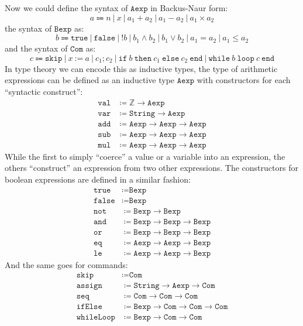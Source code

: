 \documentclass[
  a4paper, 
  10pt, 
  parskip=half, 
  DIV=20,
  toc=bibliography,
  usegeometry,
]{scrartcl}
\begin{document}
Now we could define the syntax of \(\texttt{Aexp}\) in Backus-Naur form:
\[
a \Coloneqq n \ | \ x \ | \ a_1 + a_2 \ | \ a_1 - a_2 \ | \ a_1 \times a_2
\]
the syntax of \(\texttt{Bexp}\) as:
\[
b \Coloneqq \texttt{true} \ | \ \texttt{false} \ | \ 
  !b \ | \ b_1 \land b_2 \ | \ b_1 \lor b_2 \ | \ a_1 = a_2 \ | \ a_1 \leq a_2
\]
and the syntax of \(\texttt{Com}\) as:
\[
c \Coloneqq \texttt{skip} \ | \ x \ \texttt{:=} \ a \ | \ c_1; c_2 \ | \
      \texttt{if} \ b \ \texttt{then} \ c_1 \ \texttt{else} \ c_2 \ \texttt{end} 
      \ | \ \texttt{while} \ b \ \texttt{loop} \ c \ \texttt{end}
\]
In type theory we can encode this as inductive types, the type of arithmetic 
expressions can be defined as an inductive type \(\texttt{Aexp}\) with 
constructors for each \enquote{syntactic construct}:
\begin{align*}
  \texttt{val} &\coloneqq \mathbb{Z} \to \texttt{Aexp} \\
  \texttt{var} &\coloneqq \texttt{String} \to \texttt{Aexp} \\
  \texttt{add} &\coloneqq \texttt{Aexp} \to \texttt{Aexp} \to \texttt{Aexp} \\
  \texttt{sub} &\coloneqq \texttt{Aexp} \to \texttt{Aexp} \to \texttt{Aexp} \\
  \texttt{mul} &\coloneqq \texttt{Aexp} \to \texttt{Aexp} \to \texttt{Aexp}
\end{align*}
While the first to simply \enquote{coerce} a value or a variable into an
expression, the others \enquote{construct} an expression from two other
expressions. The constructors for boolean expressions are defined in a similar
fashion:
\begin{align*}
  \texttt{true} &\coloneqq \texttt{Bexp} \\
  \texttt{false} &\coloneqq \texttt{Bexp} \\
  \texttt{not} &\coloneqq \texttt{Bexp} \to \texttt{Bexp} \\
  \texttt{and} &\coloneqq \texttt{Bexp} \to \texttt{Bexp} \to \texttt{Bexp} \\
  \texttt{or} &\coloneqq \texttt{Bexp} \to \texttt{Bexp} \to \texttt{Bexp} \\
  \texttt{eq} &\coloneqq \texttt{Aexp} \to \texttt{Aexp} \to \texttt{Bexp} \\
  \texttt{le} &\coloneqq \texttt{Aexp} \to \texttt{Aexp} \to \texttt{Bexp}
\end{align*}
And the same goes for commands:
\begin{align*}
  \texttt{skip} &\coloneqq \texttt{Com} \\
  \texttt{assign} &\coloneqq \texttt{String} \to \texttt{Aexp} \to \texttt{Com} \\
  \texttt{seq} &\coloneqq \texttt{Com} \to \texttt{Com} \to \texttt{Com} \\
  \texttt{ifElse} &\coloneqq \texttt{Bexp} \to \texttt{Com} \to \texttt{Com} \to \texttt{Com} \\
  \texttt{whileLoop} &\coloneqq \texttt{Bexp} \to \texttt{Com} \to \texttt{Com}
\end{align*}
\end{document}
